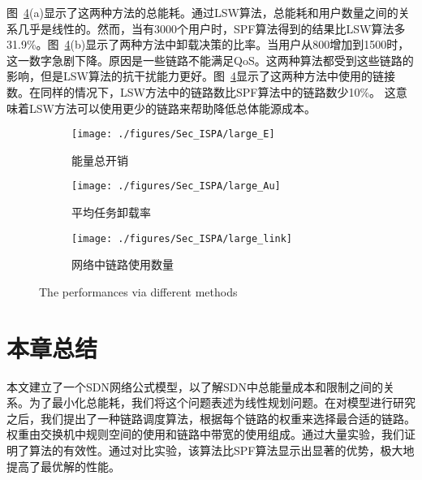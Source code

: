 图~\ref{fig_large}(a)显示了这两种方法的总能耗。通过LSW算法，总能耗和用户数量之间的关系几乎是线性的。然而，当有3000个用户时，SPF算法得到的结果比LSW算法多31.9\%。图~\ref{fig_large}(b)显示了两种方法中卸载决策的比率。当用户从800增加到1500时，这一数字急剧下降。原因是一些链路不能满足QoS。这两种算法都受到这些链路的影响，但是LSW算法的抗干扰能力更好。图~\ref{fig_large}显示了这两种方法中使用的链接数。在同样的情况下，LSW方法中的链路数比SPF算法中的链路数少10\%。 这意味着LSW方法可以使用更少的链路来帮助降低总体能源成本。

\begin{figure}[!h]
  \centering
  \begin{subfigure}[b]{0.32\linewidth}
    \texttt{[image: ./figures/Sec\_ISPA/large\_E]}
    \label{fig_largeE}
    \caption{能量总开销}
  \end{subfigure}
  \begin{subfigure}[b]{0.32\linewidth}
    \texttt{[image: ./figures/Sec\_ISPA/large\_Au]}
    \label{fig_largeAu}
    \caption{平均任务卸载率}
  \end{subfigure}
  \begin{subfigure}[b]{0.32\linewidth}
    \texttt{[image: ./figures/Sec\_ISPA/large\_link]}
    \label{fig_largeL}
    \caption{网络中链路使用数量}
  \end{subfigure}
  \caption{The performances via different methods}
  \label{fig_large}
\end{figure}

\section{本章总结}

本文建立了一个SDN网络公式模型，以了解SDN中总能量成本和限制之间的关系。为了最小化总能耗，我们将这个问题表述为线性规划问题。在对模型进行研究之后，我们提出了一种链路调度算法，根据每个链路的权重来选择最合适的链路。权重由交换机中规则空间的使用和链路中带宽的使用组成。通过大量实验，我们证明了算法的有效性。通过对比实验，该算法比SPF算法显示出显著的优势，极大地提高了最优解的性能。


